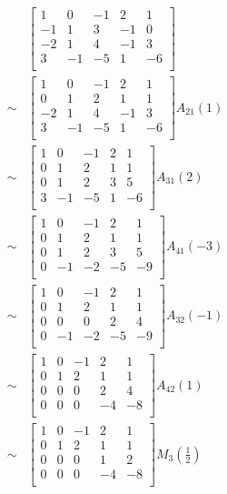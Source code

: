 \documentclass{article}
\begin{document}
\begin{equation*}
\begin{split}
&\begin{bmatrix}
1&0&-1&2&1\\
-1&1&3&-1&0\\
-2&1&4&-1&3\\
3&-1&-5&1&-6\\
\end{bmatrix}\\
\sim&\begin{bmatrix}
1&0&-1&2&1\\
0&1&2&1&1\\
-2&1&4&-1&3\\
3&-1&-5&1&-6\\
\end{bmatrix}A_{21}(1)\\
\sim&\begin{bmatrix}
1&0&-1&2&1\\
0&1&2&1&1\\
0&1&2&3&5\\
3&-1&-5&1&-6\\
\end{bmatrix}A_{31}(2)\\
\sim&\begin{bmatrix}
1&0&-1&2&1\\
0&1&2&1&1\\
0&1&2&3&5\\
0&-1&-2&-5&-9\\
\end{bmatrix}A_{41}(-3)\\
\sim&\begin{bmatrix}
1&0&-1&2&1\\
0&1&2&1&1\\
0&0&0&2&4\\
0&-1&-2&-5&-9\\
\end{bmatrix}A_{32}(-1)\\
\sim&\begin{bmatrix}
1&0&-1&2&1\\
0&1&2&1&1\\
0&0&0&2&4\\
0&0&0&-4&-8\\
\end{bmatrix}A_{42}(1)\\
\sim&\begin{bmatrix}
1&0&-1&2&1\\
0&1&2&1&1\\
0&0&0&1&2\\
0&0&0&-4&-8\\
\end{bmatrix}M_{3}(\frac{1}{2})\\
\end{split}
\end{equation*}
\end{document}
